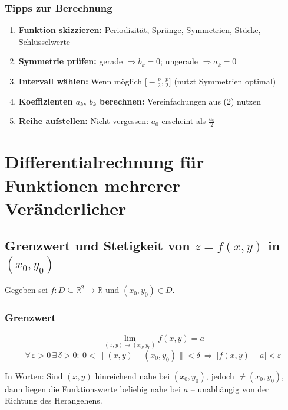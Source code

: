 \documentclass[a4paper,11pt,oneside,open=any,parskip=half, DIV=15]{scrreprt}
\begin{document}
   \subsection*{Tipps zur Berechnung}
      \begin{enumerate}
         \item \textbf{Funktion skizzieren:} Periodizität, Sprünge, Symmetrien, Stücke, Schlüsselwerte
         \item \textbf{Symmetrie prüfen:} gerade \(\Rightarrow b_k=0\); ungerade \(\Rightarrow a_k=0\)
         \item \textbf{Intervall wählen:} Wenn möglich \(\big[-\tfrac p2,\tfrac p2\big]\) (nutzt Symmetrien optimal)
         \item \textbf{Koeffizienten \(a_k\), \(b_k\) berechnen:} Vereinfachungen aus (2) nutzen
         \item \textbf{Reihe aufstellen:} Nicht vergessen: \(a_0\) erscheint als \(\tfrac{a_0}{2}\)
      \end{enumerate}


\chapter{Differentialrechnung für Funktionen mehrerer Veränderlicher}

\section{Grenzwert und Stetigkeit von \texorpdfstring{\(z=f(x,y)\)}{z=f(x,y)} in \texorpdfstring{\((x_0,y_0)\)}{(x0,y0)}}

   Gegeben sei \(f:D\subseteq\mathbb{R}^2\to\mathbb{R}\) und \((x_0,y_0)\in D\).

   \subsection*{Grenzwert}

      \begin{importantbox}
      \[
         \lim_{(x,y)\to(x_0,y_0)} f(x,y)=a
      \]
      \[
         \forall\,\varepsilon>0\,\exists\,\delta>0:\ 
         0<\|(x,y)-(x_0,y_0)\|<\delta\ \Rightarrow\ |f(x,y)-a|<\varepsilon
      \]
      \end{importantbox}

      In Worten: Sind \((x,y)\) hinreichend nahe bei \((x_0,y_0)\), jedoch \(\neq (x_0,y_0)\), dann liegen die Funktionswerte beliebig nahe bei \(a\) – unabhängig von der Richtung des Herangehens.
\end{document}

